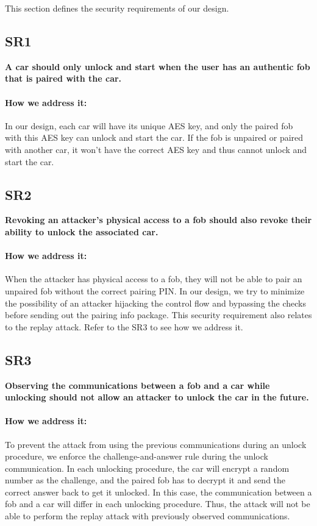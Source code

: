 \documentclass[11pt,oneside,onecolumn,letterpaper]{article}
\begin{document}
This section defines the security requirements of our design.

\subsection{SR1}
\textbf{A car should only unlock and start when the user has an authentic fob that is paired with the car.}

\paragraph{How we address it:}
In our design, each car will have its unique AES key, and only the paired fob with this AES key can unlock and start the car.
If the fob is unpaired or paired with another car, it won't have the correct AES key and thus cannot unlock and start the car.

\subsection{SR2}
\textbf{Revoking an attacker's physical access to a fob should also revoke their ability to unlock the associated car.}

\paragraph{How we address it:}
When the attacker has physical access to a fob, they will not be able to pair an unpaired fob without the correct pairing PIN.
In our design, we try to minimize the possibility of an attacker hijacking the control flow and bypassing the checks before sending out the pairing info package.
This security requirement also relates to the replay attack. Refer to the SR3 to see how we address it.

\subsection{SR3}
\textbf{Observing the communications between a fob and a car while unlocking should not allow an attacker to unlock the car in the future.}

\paragraph{How we address it:}
To prevent the attack from using the previous communications during an unlock procedure, we enforce the challenge-and-answer rule during the unlock communication.
In each unlocking procedure, the car will encrypt a random number as the challenge, and the paired fob has to decrypt it and send the correct answer back to get it unlocked.
In this case, the communication between a fob and a car will differ in each unlocking procedure.
Thus, the attack will not be able to perform the replay attack with previously observed communications.
\end{document}
